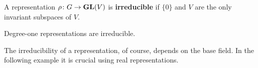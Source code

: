 
\begin{definition}
    A representation $\rho\colon G\to\mathbf{GL}(V)$ is \textbf{irreducible} if
    $\{0\}$ and $V$ are the only invariant subspaces of $V$.
\end{definition}

Degree-one representations are irreducible. 

The irreducibility 
of a representation, of course, depends on the base field. 
In the following example it is crucial using real representations.

